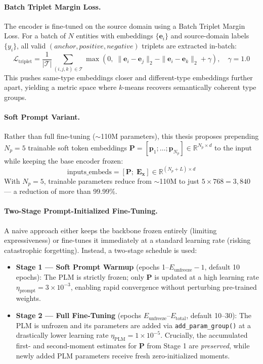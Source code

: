 \documentclass[11pt,a4paper]{article}
\begin{document}
\paragraph{Batch Triplet Margin Loss.}
The encoder is fine-tuned on the source domain using a Batch Triplet Margin Loss. For a batch of $N$ entities with embeddings $\{\mathbf{e}_i\}$ and source-domain labels $\{y_i\}$, all valid $(anchor, positive, negative)$ triplets are extracted in-batch:
\begin{equation}
  \mathcal{L}_{\text{triplet}} = \frac{1}{|\mathcal{T}|}\sum_{(i,j,k)\in\mathcal{T}}
    \max\!\left(0,\;\|\mathbf{e}_i - \mathbf{e}_j\|_2 - \|\mathbf{e}_i - \mathbf{e}_k\|_2 + \gamma\right), \quad \gamma = 1.0
\end{equation}
This pushes same-type embeddings closer and different-type embeddings further apart, yielding a metric space where $k$-means recovers semantically coherent type groups.

\paragraph{Soft Prompt Variant.}
Rather than full fine-tuning ($\sim$110M parameters), this thesis proposes prepending $N_p = 5$ trainable soft token embeddings $\mathbf{P} = [\mathbf{p}_1;\ldots;\mathbf{p}_{N_p}] \in \mathbb{R}^{N_p \times d}$ to the input while keeping the base encoder frozen:
\begin{equation}
  \text{inputs\_embeds} = [\mathbf{P};\;\mathbf{E}_{\mathbf{x}}] \in \mathbb{R}^{(N_p+L)\times d}
\end{equation}
With $N_p = 5$, trainable parameters reduce from $\sim$110M to just $5 \times 768 = 3{,}840$ — a reduction of more than 99.99\%.

\paragraph{Two-Stage Prompt-Initialized Fine-Tuning.}
A naive approach either keeps the backbone frozen entirely (limiting expressiveness) or fine-tunes it immediately at a standard learning rate (risking catastrophic forgetting). Instead, a two-stage schedule is used:

\begin{itemize}[noitemsep]
  \item \textbf{Stage 1 — Soft Prompt Warmup} (epochs 1–$E_{\text{unfreeze}}{-}1$, default 10 epochs): The PLM is strictly frozen; only $\mathbf{P}$ is updated at a high learning rate $\eta_{\text{prompt}} = 3{\times}10^{-3}$, enabling rapid convergence without perturbing pre-trained weights.
  \item \textbf{Stage 2 — Full Fine-Tuning} (epochs $E_{\text{unfreeze}}$–$E_{\text{total}}$, default 10–30): The PLM is unfrozen and its parameters are added via \texttt{add\_param\_group()} at a drastically lower learning rate $\eta_{\text{PLM}} = 1{\times}10^{-5}$. Crucially, the accumulated first- and second-moment estimates for $\mathbf{P}$ from Stage 1 are \emph{preserved}, while newly added PLM parameters receive fresh zero-initialized moments.
\end{itemize}
\end{document}

